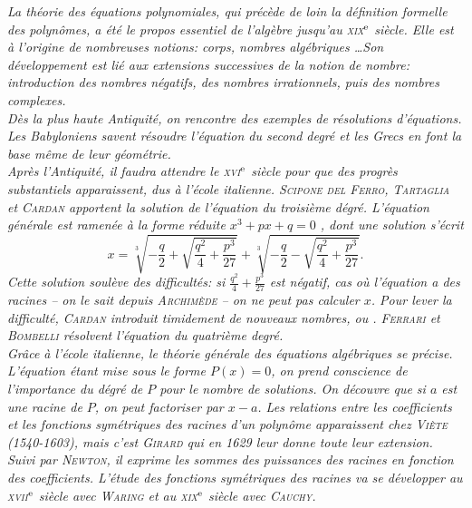 \textsl{
La théorie des équations polynomiales, qui précède de loin la définition formelle des polynômes, a été le propos essentiel de l'algèbre jusqu'au \textsc{xix}$^\textsl{e}$ siècle. Elle est à l'origine de nombreuses notions: corps, nombres algébriques \dots Son développement est lié aux extensions successives de la notion de nombre: introduction des nombres négatifs, des nombres irrationnels, puis des nombres complexes. \\
Dès la plus haute Antiquité, on rencontre des exemples de résolutions d'équations. Les Babyloniens savent résoudre l'équation du second degré et les Grecs en font la base même de leur géométrie. \\
Après l'Antiquité, il faudra attendre le \textsc{xvi}$^{\mathrm{e}}$ siècle pour que des progrès substantiels apparaissent, dus à l'école italienne. \textsc{Scipone del Ferro}, \textsc{Tartaglia} et \textsc{Cardan} apportent la solution de l'équation du troisième dégré. L'équation générale est ramenée à la forme réduite $x^3 + px + q = 0$ \note, dont une solution s'écrit
$$
x = \sqrt[3]{-\frac{q}{2} + \sqrt{\frac{q^2}{4} + \frac{p^3}{27}}} + \sqrt[3]{-\frac{q}{2} - \sqrt{\frac{q^2}{4} + \frac{p^3}{27}}}.
$$
Cette solution soulève des difficultés: si $\frac{q^2}{4} + \frac{p^3}{27}$ est négatif, cas où l'équation a des racines -- on le sait depuis \textsc{Archimède} -- on ne peut pas calculer $x$. Pour lever la difficulté, \textsc{Cardan} introduit timidement de nouveaux nombres,  ou . \textsc{Ferrari} et \textsc{Bombelli} résolvent l'équation du quatrième degré. \\
Grâce à l'école italienne, le théorie générale des équations algébriques se précise. L'équation étant mise sous le forme $P(x) = 0$, on prend conscience de l'importance du dégré de $P$ pour le nombre de solutions. On découvre que si $a$ est une racine de $P$, on peut factoriser par $x-a$. Les relations entre les coefficients et les fonctions symétriques des racines d'un polynôme apparaissent chez \textsc{Viète} (1540-1603), mais c'est \textsc{Girard} qui en 1629 leur donne toute leur extension. Suivi par \textsc{Newton}, il exprime les sommes des puissances des racines en fonction des coefficients. L'étude des fonctions symétriques des racines va se développer au \textsc{xvii}$^{\mathrm{e}}$ siècle avec \textsc{Waring} et au \textsc{xix}$^{\mathrm{e}}$ siècle avec \textsc{Cauchy}. \\
}
